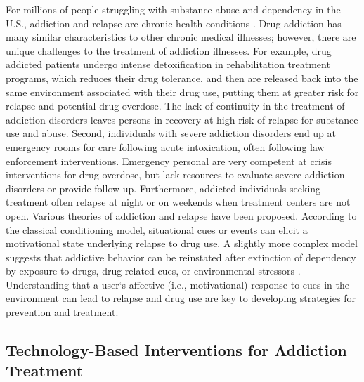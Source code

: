 \documentclass[sigconf]{acmart}
\begin{document}
For millions of people struggling with substance abuse and dependency in 
the U.S., addiction and relapse are chronic health conditions \cite{boyer10}. 
Drug addiction has many similar characteristics to other chronic medical 
illnesses; however, there are unique challenges to the treatment of addiction
illnesses. For example, drug addicted patients undergo intense detoxification 
in rehabilitation treatment programs, which reduces their drug tolerance, and 
then are released back into the same environment associated with their drug use, 
putting them at greater risk for relapse and potential drug overdose. The lack 
of continuity in the treatment of addiction disorders leaves persons in recovery 
at high risk of relapse for substance use and abuse. Second, individuals with 
severe addiction disorders end up at emergency rooms for care following acute 
intoxication, often following law enforcement interventions. Emergency personal 
are very competent at crisis interventions for drug overdose, but lack resources 
to evaluate severe addiction disorders or provide follow-up. Furthermore, 
addicted individuals seeking treatment often relapse at night or on weekends 
when treatment centers are not open. Various theories of addiction and relapse 
have been proposed. According to the classical conditioning model, situational 
cues or events can elicit a motivational state underlying relapse to drug use. 
A slightly more complex model suggests that addictive behavior can be reinstated 
after extinction of dependency by exposure to drugs, drug-related cues, or 
environmental stressors \cite{shaham03}. Understanding that a user`s affective
(i.e., motivational) response to cues in the environment can lead to relapse 
and drug use are key to developing strategies for prevention and treatment. 

\subsection{Technology-Based Interventions for Addiction Treatment}
\end{document}
